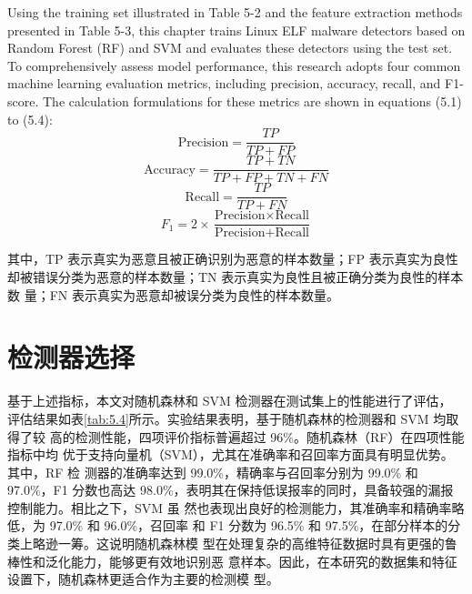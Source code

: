 Using the training set illustrated in Table 5-2 and the feature extraction methods presented in Table 5-3, this chapter trains Linux ELF malware detectors based on Random Forest (RF) and SVM and evaluates these detectors using the test set. To comprehensively assess model performance, this research adopts four common machine learning evaluation metrics, including precision, accuracy, recall, and F1-score. The calculation formulations for these metrics are shown in equations (5.1) to (5.4):
\begin{equation}
	\text{Precision} = \frac{TP}{TP + FP}
	\tag{5.1}
\end{equation}
\begin{equation}
	\text{Accuracy} = \frac{TP + TN}{TP + FP + TN + FN}
	\tag{5.2}
\end{equation}
\begin{equation}
	\text{Recall} = \frac{TP}{TP + FN}
	\tag{5.3}
\end{equation}
\begin{equation}
	F_1 = 2 \times \frac{\text{Precision} \times \text{Recall}}{\text{Precision} + \text{Recall}}
	\tag{5.4}
\end{equation}

其中，TP 表示真实为恶意且被正确识别为恶意的样本数量；FP 表示真实为良性
却被错误分类为恶意的样本数量；TN 表示真实为良性且被正确分类为良性的样本数
量；FN 表示真实为恶意却被误分类为良性的样本数量。


\section{检测器选择}

基于上述指标，本文对随机森林和 SVM 检测器在测试集上的性能进行了评估，
评估结果如表\ref{tab:5.4}所示。实验结果表明，基于随机森林的检测器和 SVM 均取得了较
高的检测性能，四项评价指标普遍超过 96\%。随机森林（RF）在四项性能指标中均
优于支持向量机（SVM），尤其在准确率和召回率方面具有明显优势。其中，RF 检
测器的准确率达到 99.0\%，精确率与召回率分别为 99.0\% 和 97.0\%，F1 分数也高达
98.0\%，表明其在保持低误报率的同时，具备较强的漏报控制能力。相比之下，SVM 虽
然也表现出良好的检测能力，其准确率和精确率略低，为 97.0\% 和 96.0\%，召回率
和 F1 分数为 96.5\% 和 97.5\%，在部分样本的分类上略逊一筹。这说明随机森林模
型在处理复杂的高维特征数据时具有更强的鲁棒性和泛化能力，能够更有效地识别恶
意样本。因此，在本研究的数据集和特征设置下，随机森林更适合作为主要的检测模
型。


